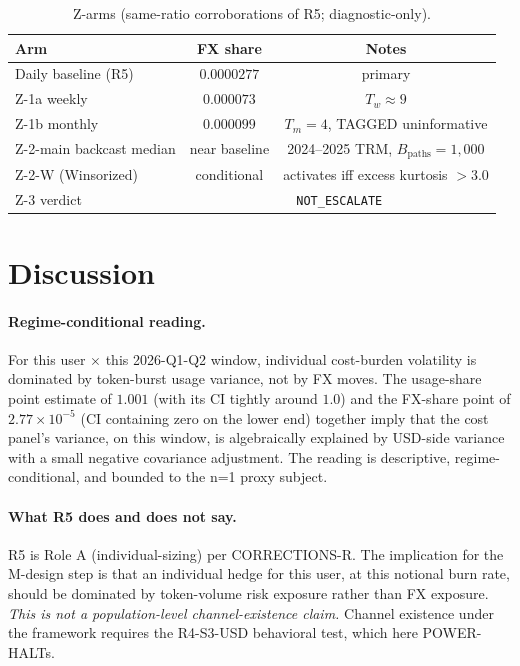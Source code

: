 \documentclass[11pt,letterpaper]{article}
\begin{document}
\begin{table}[h]
\centering
\caption{Z-arms (same-ratio corroborations of R5; diagnostic-only).}
\label{tab:zarms}
\begin{tabular}{lcc}
\toprule
Arm                                  & FX share        & Notes \\
\midrule
Daily baseline (R5)                  & \(0.0000277\)   & primary \\
Z-1a weekly                          & \(0.000073\)    & \(T_w \approx 9\) \\
Z-1b monthly                         & \(0.000099\)    & \(T_m = 4\), TAGGED uninformative \\
Z-2-main backcast median             & near baseline   & 2024--2025 TRM, \(B_{\text{paths}}=1{,}000\) \\
Z-2-W (Winsorized)                   & conditional     & activates iff excess kurtosis \(> 3.0\) \\
\midrule
Z-3 verdict                          & \multicolumn{2}{c}{\texttt{NOT\_ESCALATE}} \\
\bottomrule
\end{tabular}
\end{table}

\section{Discussion}
\label{sec:discuss}

\paragraph{Regime-conditional reading.}
For this user \(\times\) this 2026-Q1-Q2 window, individual
cost-burden volatility is dominated by token-burst usage variance,
not by FX moves. The usage-share point estimate of \(1.001\) (with
its CI tightly around \(1.0\)) and the FX-share point of
\(2.77 \!\times\! 10^{-5}\) (CI containing zero on the lower end)
together imply that the cost panel's variance, on this window, is
algebraically explained by USD-side variance with a small negative
covariance adjustment. The reading is descriptive, regime-conditional,
and bounded to the n=1 proxy subject.

\paragraph{What R5 does and does not say.}
R5 is Role A (individual-sizing) per CORRECTIONS-R. The implication
for the M-design step is that an individual hedge for this user, at
this notional burn rate, should be dominated by token-volume risk
exposure rather than FX exposure. \emph{This is not a population-level
channel-existence claim.} Channel existence under the framework
requires the R4-S3-USD behavioral test, which here POWER-HALTs.
\end{document}
